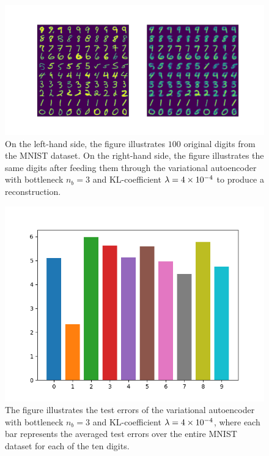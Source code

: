 \begin{figure}
\begin{center}
      \includegraphics[trim = 15mm 10mm 15mm 15mm, clip, width=\linewidth]{convolutional_VAE_snd_KL_4e-4_5k_epochs_3D_inference}
\end{center}
\caption{On the left-hand side, the figure illustrates $100$ original digits from the MNIST dataset. On the right-hand side, the figure illustrates the same digits after feeding them through the variational autoencoder with bottleneck $n_b=3$ and KL-coefficient $\lambda=\num{4e-4}$ to produce a reconstruction.}\label{fig:convolutional_VAE_snd_KL_4e-4_5k_epochs_3D_inference}
\end{figure}


\begin{figure}
\begin{center}
      \includegraphics[width=0.49\linewidth]{convolutional_VAE_snd_KL_4e-4_5k_epochs_3D_errors}
\end{center}
\caption{The figure illustrates the test errors of the variational autoencoder with bottleneck $n_b=3$ and KL-coefficient $\lambda = \num{4e-4}$, where each bar represents the averaged test errors over the entire MNIST dataset for each of the ten digits.}\label{fig:convolutional_VAE_snd_KL_4e-4_5k_epochs_3D_errors}
\end{figure}



